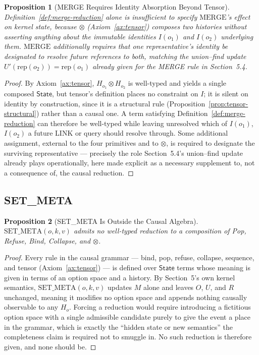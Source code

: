 \documentclass[11pt]{article}
\newtheorem{proposition}{Proposition}[section]
\begin{document}
\begin{proposition}[MERGE Requires Identity Absorption Beyond Tensor]
\label{prop:merge-identity}
Definition~\ref{def:merge-reduction} alone is insufficient to specify $\mathrm{MERGE}$'s effect on kernel state, because $\otimes$ (Axiom~\ref{ax:tensor}) composes two histories without asserting anything about the immutable identities $I(o_1)$ and $I(o_2)$ underlying them. $\mathrm{MERGE}$ additionally requires that one representative's identity be designated to resolve future references to both, matching the union--find update $U'(\mathrm{rep}(o_2)) = \mathrm{rep}(o_1)$ already given for the MERGE rule in Section~5.4.
\end{proposition}
\begin{proof}
By Axiom~\ref{ax:tensor}, $H_{o_1} \otimes H_{o_2}$ is well-typed and yields a single composed $\mathsf{State}$, but tensor's definition places no constraint on $I$; it is silent on identity by construction, since it is a structural rule (Proposition~\ref{prop:tensor-structural}) rather than a causal one. A term satisfying Definition~\ref{def:merge-reduction} can therefore be well-typed while leaving unresolved which of $I(o_1)$, $I(o_2)$ a future LINK or query should resolve through. Some additional assignment, external to the four primitives and to $\otimes$, is required to designate the surviving representative --- precisely the role Section~5.4's union--find update already plays operationally, here made explicit as a necessary supplement to, not a consequence of, the causal reduction.
\end{proof}

\subsection{SET\_META}

\begin{proposition}[SET\_META Is Outside the Causal Algebra]
\label{prop:setmeta-boundary}
$\mathrm{SET\_META}(o,k,v)$ admits no well-typed reduction to a composition of Pop, Refuse, Bind, Collapse, and $\otimes$.
\end{proposition}
\begin{proof}
Every rule in the causal grammar --- bind, pop, refuse, collapse, sequence, and tensor (Axiom~\ref{ax:tensor}) --- is defined over $\mathsf{State}$ terms whose meaning is given in terms of an option space and a history. By Section~5's own kernel semantics, $\mathrm{SET\_META}(o,k,v)$ updates $M$ alone and leaves $O$, $U$, and $R$ unchanged, meaning it modifies no option space and appends nothing causally observable to any $H_o$. Forcing a reduction would require introducing a fictitious option space with a single admissible candidate purely to give the event a place in the grammar, which is exactly the ``hidden state or new semantics'' the completeness claim is required not to smuggle in. No such reduction is therefore given, and none should be.
\end{proof}
\end{document}

